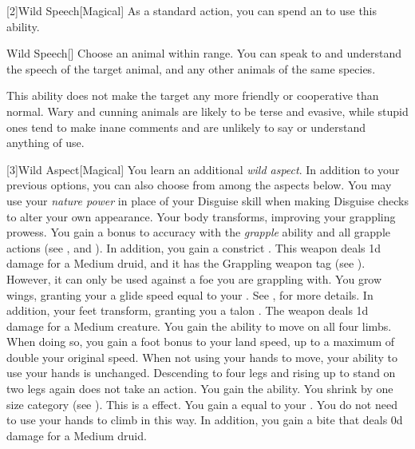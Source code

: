         [2]{Wild Speech}[Magical] As a standard action, you can spend an  to use this ability.
        \begin{ability}{Wild Speech}[]
            Choose an animal within \rnglong range.
            You can speak to and understand the speech of the target animal, and any other animals of the same species.

            This ability does not make the target any more friendly or cooperative than normal.
            Wary and cunning animals are likely to be terse and evasive, while stupid ones tend to make inane comments and are unlikely to say or understand anything of use.
        \end{ability}

        [3]{Wild Aspect}[Magical]
        You learn an additional \textit{wild aspect}.
        In addition to your previous options, you can also choose from among the aspects below.
        {
            You may use your \textit{nature power} in place of your Disguise skill when making Disguise checks to alter your own appearance.
            Your body transforms, improving your grappling prowess.
            You gain a  bonus to accuracy with the \textit{grapple} ability and all grapple actions (see , and ).
            In addition, you gain a constrict .
            This weapon deals \plus1d damage for a Medium druid, and it has the Grappling weapon tag (see ).
            However, it can only be used against a foe you are grappling with.
            You grow wings, granting your a glide speed equal to your .
            See , for more details.
            In addition, your feet transform, granting you a talon .
            The weapon deals \minus1d damage for a Medium creature.
            You gain the ability to move on all four limbs.
            When doing so, you gain a  foot bonus to your land speed, up to a maximum of double your original speed.
            When not using your hands to move, your ability to use your hands is unchanged.
            Descending to four legs and rising up to stand on two legs again does not take an action.
            You gain the  ability.
            You shrink by one size category (see ).
            This is a  effect.
            You gain a  equal to your .
            You do not need to use your hands to climb in this way.
            In addition, you gain a bite  that deals \plus0d damage for a Medium druid.
        }

